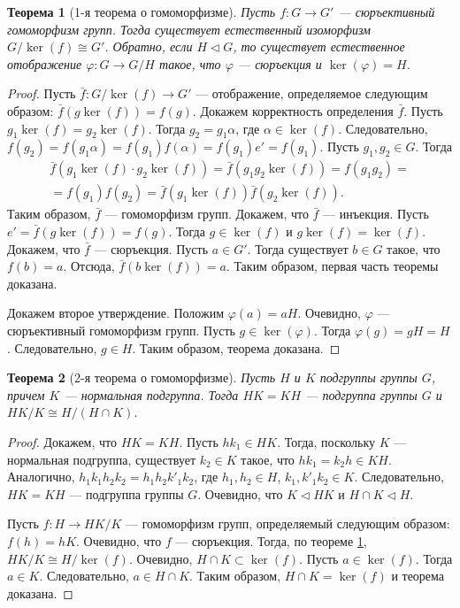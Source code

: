 \documentclass[12pt, titlepage, oneside]{amsbook}
\newtheorem{theorem}{Теорема}[chapter]
\theoremstyle{definition}
\theoremstyle{remark}
\begin{document}
\begin{theorem}[1-я теорема о гомоморфизме]
	\label{GomGr3} Пусть $f\colon G\rightarrow G'$ --- сюръективный
	гомоморфизм групп. Тогда существует естественный изоморфизм
	$G/\ker(f)\cong G'$. Обратно, если $H\triangleleft G$, то существует
	естественное отображение $\varphi\colon G\rightarrow G/H$ такое, что
	$\varphi$ --- сюръекция и $\ker(\varphi)=H$.
\end{theorem}

\begin{proof}
	Пусть $\bar{f}\colon G/\ker(f)\rightarrow G'$ --- отображение,
	определяемое следующим образом: $\bar{f}(g\ker(f))=f(g)$. Докажем
	корректность определения $\bar{f}$. Пусть
	$g_{1}\ker(f)=g_{2}\ker(f)$. Тогда $g_2 = g_1 \alpha$, где
	$\alpha\in\ker(f)$. Следовательно,
	$f(g_2)=f(g_1\alpha)=f(g_1)f(\alpha)=f(g_1)e'=f(g_1)$. Пусть $g_1, g_2\in G$.
	Тогда
	\begin{multline*}
		\bar{f}(g_1\ker(f)\cdot
		g_2\ker(f))=\bar{f}(g_1g_2\ker(f))=f(g_1g_2)=\\=f(g_1)f(g_2)=\bar{f}(g_1\ker(f))\bar{f}(g_2\ker(f)).
	\end{multline*} Таким образом, $\bar{f}$
	--- гомоморфизм групп. Докажем, что $\bar{f}$ --- инъекция. Пусть
	$e'=\bar{f}(g\ker(f))=f(g)$. Тогда $g\in\ker(f)$ и $g\ker(f)=\ker(f)$. Докажем, что
	$\bar{f}$ --- сюръекция. Пусть $a\in G'$. Тогда существует $b\in G$
	такое, что $f(b)=a$. Отсюда, $\bar{f}(b\ker(f))=a$. Таким образом,
	первая часть теоремы доказана.
	
	Докажем второе утверждение. Положим $\varphi(a)=aH$. Очевидно, $\varphi$
	--- сюръективный гомоморфизм групп. Пусть $g\in\ker(\varphi)$. Тогда
	$\varphi(g)=gH=H$. Следовательно, $g\in H$. Таким образом, теорема
	доказана.
\end{proof}

\begin{theorem}[2-я теорема о гомоморфизме]
	\label{GomGr4} Пусть $H$ и $K$ подгруппы группы $G$, причем $K$ ---
	нормальная подгруппа. Тогда $HK=KH$ --- подгруппа группы $G$ и
	$HK/K\cong H/(H\cap K)$.
\end{theorem}

\begin{proof}
	Докажем, что $HK=KH$. Пусть $hk_1\in HK$. Тогда, поскольку $K$ ---
	нормальная подгруппа, существует $k_2\in K$ такое, что $hk_1=k_2h\in
		KH$. Аналогично, $h_1k_1h_2k_2=h_1h_2k'_1k_2$, где $h_1,h_2\in H$, $k_1,k'_1k_2\in K$. Следовательно, $HK=KH$ --- подгруппа группы $G$. Очевидно, что $K\triangleleft HK$ и $H\cap K\triangleleft H$.
	
	Пусть $f\colon H\rightarrow HK/K$ --- гомоморфизм групп,
	определяемый следующим образом: $f(h)=hK$. Очевидно, что $f$ ---
	сюръекция. Тогда, по теореме \ref{GomGr3}, $HK/K\cong H/\ker(f)$.
	Очевидно, $H\cap K\subset\ker(f)$. Пусть $a\in\ker(f)$. Тогда $a\in
		K$. Следовательно, $a\in H\cap K$. Таким образом, $H\cap K=\ker(f)$
	и теорема доказана.
\end{proof}
\end{document}
